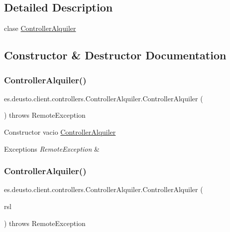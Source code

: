 \subsection{Detailed Description}
clase \mbox{\hyperlink{classes_1_1deusto_1_1client_1_1controllers_1_1_controller_alquiler}{Controller\+Alquiler}} 

\subsection{Constructor \& Destructor Documentation}
\mbox{\label{classes_1_1deusto_1_1client_1_1controllers_1_1_controller_alquiler_afa1f8ce5feacaa7a210d2d04c971e506}} 
\subsubsection{\texorpdfstring{ControllerAlquiler()}{ControllerAlquiler()}\hspace{0.1cm}{\footnotesize\ttfamily [1/2]}}
{\footnotesize\ttfamily es.\+deusto.\+client.\+controllers.\+Controller\+Alquiler.\+Controller\+Alquiler (\begin{DoxyParamCaption}{ }\end{DoxyParamCaption}) throws Remote\+Exception}

Constructor vacio \mbox{\hyperlink{classes_1_1deusto_1_1client_1_1controllers_1_1_controller_alquiler}{Controller\+Alquiler}} 
\begin{DoxyExceptions}{Exceptions}
{\em Remote\+Exception} & \\
\hline
\end{DoxyExceptions}
\mbox{\label{classes_1_1deusto_1_1client_1_1controllers_1_1_controller_alquiler_a0b4f00dfc825b01070dc7d0306fb2f28}} 
\subsubsection{\texorpdfstring{ControllerAlquiler()}{ControllerAlquiler()}\hspace{0.1cm}{\footnotesize\ttfamily [2/2]}}
{\footnotesize\ttfamily es.\+deusto.\+client.\+controllers.\+Controller\+Alquiler.\+Controller\+Alquiler (\begin{DoxyParamCaption}\item[{\mbox{\hyperlink{classes_1_1deusto_1_1client_1_1remote_1_1_service_locator}{Service\+Locator}}}]{rsl }\end{DoxyParamCaption}) throws Remote\+Exception}

